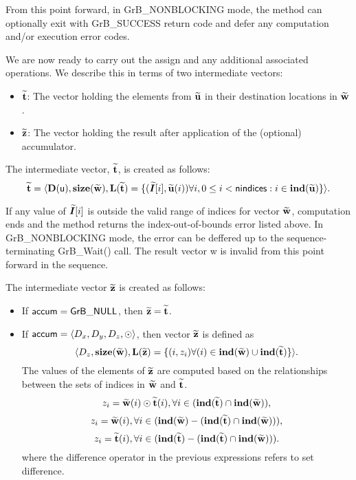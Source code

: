 From this point forward, in {\sf GrB\_NONBLOCKING} mode, the method can optionally exit
with {\sf GrB\_SUCCESS} return code and defer any computation and/or execution error
codes.

We are now ready to carry out the assign and any additional 
associated operations.  We describe this in terms of two intermediate vectors:
\begin{itemize}
	\item ${\bf \widetilde{t}}$: The vector holding the elements from
		${\bf \widetilde{u}}$ in their destination locations in ${\bf \widetilde{w}}$.
	\item ${\bf \widetilde{z}}$: The vector holding the result after 
    application of the (optional) accumulator.
\end{itemize}

The intermediate vector, ${\bf \widetilde{t}}$, is created as follows:
\[ {\bf \widetilde{t}} = \langle
\bold{D}({\sf u}), \bold{size}({\bf \widetilde{w}}),
\bold{L}({\bf \widetilde{t}}) =
\{(\bm{\widetilde{I}}[i],{\bf \widetilde{u}}(i)) \forall i, 0 \leq i < {\sf nindices} : 
i \in \bold{ind}({\bf \widetilde{u}}) \} \rangle. \]

If any value of $\bm{\widetilde{I}}[i]$ is outside the valid range of indices
for vector ${\bf \widetilde{w}}$, computation ends and the method returns the
index-out-of-bounds error listed above. In {\sf GrB\_NONBLOCKING} mode, the error
can be deffered up to the sequence-terminating {\sf GrB\_Wait()} call.
The result vector {\sf w} is invalid from this point forward in
the sequence.

The intermediate vector ${\bf \widetilde{z}}$ is created as follows:
\begin{itemize}
    \item If ${\sf accum} = {\sf GrB\_NULL}$, then ${\bf \widetilde{z}} = {\bf \widetilde{t}}$.

    \item If ${\sf accum} = \langle D_x, D_y, D_z, \odot \rangle$, then vector ${\bf \widetilde{z}}$ is defined as 
        \[ \langle D_z, \bold{size}({\bf \widetilde{w}}), \bold{L}({\bf \widetilde{z}})
		= \{(i,z_{i})  \forall (i) \in \bold{ind}({\bf \widetilde{w}}) \cup 
        \bold{ind}({\bf \widetilde{t}}) \} \rangle.\]
    The values of the elements of ${\bf \widetilde{z}}$ are computed based on the relationships between the sets of indices in ${\bf \widetilde{w}}$ and ${\bf \widetilde{t}}$.
\[
z_{i} = {\bf \widetilde{w}}(i) \odot {\bf \widetilde{t}}(i), \forall i \in  (\bold{ind}({\bf \widetilde{t}}) \cap \bold{ind}({\bf \widetilde{w}})),
\]
\[
z_{i} = {\bf \widetilde{w}}(i), \forall  i \in  (\bold{ind}({\bf \widetilde{w}}) - (\bold{ind}({\bf \widetilde{t}}) \cap \bold{ind}({\bf \widetilde{w}}))),
\]
\[
z_{i} = {\bf \widetilde{t}}(i), \forall  i \in  (\bold{ind}({\bf \widetilde{t}}) - (\bold{ind}({\bf \widetilde{t}}) \cap \bold{ind}({\bf \widetilde{w}}))).
\]
where the difference operator in the previous expressions refers to set difference.
\end{itemize}


